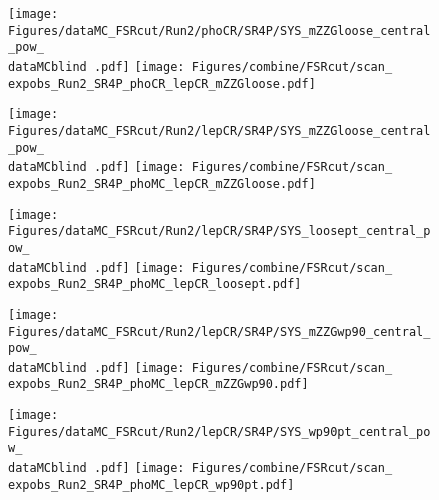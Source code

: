 \label{sec:likelihood_scans_FSRcut}

\begin{figure}
  \centering
  \texttt{[image: Figures/dataMC\_FSRcut/Run2/phoCR/SR4P/SYS\_mZZGloose\_central\_pow\_\\dataMCblind .pdf]}
  \hfill
  \texttt{[image: Figures/combine/FSRcut/scan\_\\expobs\_Run2\_SR4P\_phoCR\_lepCR\_mZZGloose.pdf]}
  \caption{}
  \label{fig:scan_FSRcut_Run2_SR4P_phoCR_lepCR_mZZGloose}
\end{figure}

\begin{figure}
  \centering
  \texttt{[image: Figures/dataMC\_FSRcut/Run2/lepCR/SR4P/SYS\_mZZGloose\_central\_pow\_\\dataMCblind .pdf]}
  \hfill
  \texttt{[image: Figures/combine/FSRcut/scan\_\\expobs\_Run2\_SR4P\_phoMC\_lepCR\_mZZGloose.pdf]}
  \caption{}
  \label{fig:scan_FSRcut_Run2_SR4P_phoMC_lepCR_mZZGloose}
\end{figure}

\begin{figure}
  \centering
  \texttt{[image: Figures/dataMC\_FSRcut/Run2/lepCR/SR4P/SYS\_loosept\_central\_pow\_\\dataMCblind .pdf]}
  \hfill
  \texttt{[image: Figures/combine/FSRcut/scan\_\\expobs\_Run2\_SR4P\_phoMC\_lepCR\_loosept.pdf]}
  \caption{}
  \label{fig:scan_FSRcut_Run2_SR4P_phoMC_lepCR_loosept}
\end{figure}

\begin{figure}
  \centering
  \texttt{[image: Figures/dataMC\_FSRcut/Run2/lepCR/SR4P/SYS\_mZZGwp90\_central\_pow\_\\dataMCblind .pdf]}
  \hfill
  \texttt{[image: Figures/combine/FSRcut/scan\_\\expobs\_Run2\_SR4P\_phoMC\_lepCR\_mZZGwp90.pdf]}
  \caption{}
  \label{fig:scan_FSRcut_Run2_SR4P_phoMC_lepCR_mZZGwp90}
\end{figure}

\begin{figure}
  \centering
  \texttt{[image: Figures/dataMC\_FSRcut/Run2/lepCR/SR4P/SYS\_wp90pt\_central\_pow\_\\dataMCblind .pdf]}
  \hfill
  \texttt{[image: Figures/combine/FSRcut/scan\_\\expobs\_Run2\_SR4P\_phoMC\_lepCR\_wp90pt.pdf]}
  \caption{}
  \label{fig:scan_FSRcut_Run2_SR4P_phoMC_lepCR_wp90pt}
\end{figure}

